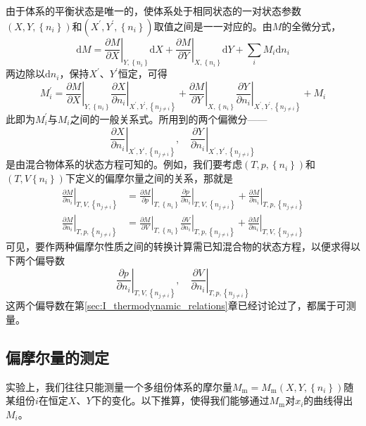 \documentclass[main.tex]{subfiles}
\begin{document}
由于体系的平衡状态是唯一的，使体系处于相同状态的一对状态参数$\left(X,Y,\left\{n_i\right\}\right)$和$\left(X^\prime,Y^\prime,\left\{n_i\right\}\right)$取值之间是一一对应的。由$M$的全微分式，
\[\mathrm{d}M=\left.\frac{\partial M}{\partial X}\right|_{Y,\left\{n_i\right\}}\mathrm{d}X+\left.\frac{\partial M}{\partial Y}\right|_{X,\left\{n_i\right\}}\mathrm{d}Y+\sum_i M_i\mathrm{d}n_i\]
两边除以$\mathrm{d}n_i$，保持$X^\prime$、$Y^\prime$恒定，可得
\[M_i^\prime=\left.\frac{\partial M}{\partial X}\right|_{Y,\left\{n_i\right\}}\left.\frac{\partial X}{\partial n_i}\right|_{X^\prime,Y^\prime,\left\{n_{j\neq i}\right\}}+\left.\frac{\partial M}{\partial Y}\right|_{X,\left\{n_i\right\}}\left.\frac{\partial Y}{\partial n_i}\right|_{X^\prime,Y^\prime,\left\{n_{j\neq i}\right\}}+M_i\]
此即为$M_i^\prime$与$M_i$之间的一般关系式。所用到的两个偏微分——
\[\left.\frac{\partial X}{\partial n_i}\right|_{X^\prime,Y^\prime,\left\{n_{j\neq i}\right\}},\quad\left.\frac{\partial Y}{\partial n_i}\right|_{X^\prime,Y^\prime,\left\{n_{j\neq i}\right\}}\]
是由混合物体系的状态方程可知的。例如，我们要考虑$\left(T,p,\left\{n_i\right\}\right)$和$\left(T,V\left\{n_i\right\}\right)$下定义的偏摩尔量之间的关系，那就是
\begin{align*}
  \left.\frac{\partial M}{\partial n_i}\right|_{T,V,\left\{n_{j\neq i}\right\}} & =\left.\frac{\partial M}{\partial p}\right|_{T,\left\{n_i\right\}}\left.\frac{\partial p}{\partial n_i}\right|_{T,V,\left\{n_{j\neq i}\right\}}+\left.\frac{\partial M}{\partial n_i}\right|_{T,p,\left\{n_{j\neq i}\right\}} \\
  \left.\frac{\partial M}{\partial n_i}\right|_{T,p,\left\{n_{j\neq i}\right\}} & =\left.\frac{\partial M}{\partial V}\right|_{T,\left\{n_i\right\}}\left.\frac{\partial V}{\partial n_i}\right|_{T,p,\left\{n_{j\neq i}\right\}}+\left.\frac{\partial M}{\partial n_i}\right|_{T,V,\left\{n_{j\neq i}\right\}}
\end{align*}
可见，要作两种偏摩尔性质之间的转换计算需已知混合物的状态方程，以便求得以下两个偏导数
\[\left.\frac{\partial p}{\partial n_i}\right|_{T,V,\left\{n_{j\neq i}\right\}},\quad\left.\frac{\partial V}{\partial n_i}\right|_{T,p,\left\{n_{j\neq i}\right\}}\]
这两个偏导数在第\ref{sec:I_thermodynamic_relations}章已经讨论过了，都属于可测量。

\subsection{偏摩尔量的测定}
实验上，我们往往只能测量一个多组份体系的摩尔量$M_\text{m}=M_\text{m}\left(X,Y,\left\{n_i\right\}\right)$随某组份$i$在恒定$X$、$Y$下的变化。以下推算，使得我们能够通过$M_\text{m}$对$x_i$的曲线得出$M_i$。
\end{document}
